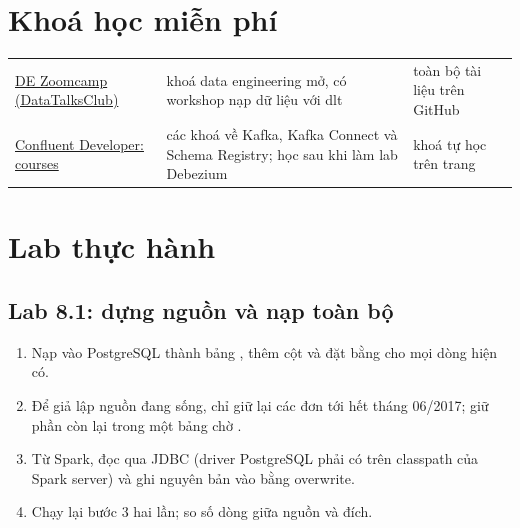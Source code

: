 \section{Khoá học miễn phí}
\begin{xltabular}{\textwidth}{@{}P{4.2cm} L P{2.6cm}@{}}
\toprule
{} &  &  \\
\midrule
\endhead
\bottomrule
\endfoot
\href{https://github.com/DataTalksClub/data-engineering-zoomcamp}{DE Zoomcamp (DataTalksClub)} & khoá data engineering mở, có workshop nạp dữ liệu với dlt & toàn bộ tài liệu trên GitHub \\
\href{https://developer.confluent.io/courses/}{Confluent Developer: courses} & các khoá về Kafka, Kafka Connect và Schema Registry; học sau khi làm lab Debezium & khoá tự học trên trang \\
\end{xltabular}

\section{Lab thực hành}

\subsection{Lab 8.1: dựng nguồn và nạp toàn bộ}
\begin{enumerate}
  \item Nạp  vào PostgreSQL thành bảng , thêm cột  và đặt bằng  cho mọi dòng hiện có.
  \item Để giả lập nguồn đang sống, chỉ giữ lại các đơn tới hết tháng 06/2017; giữ phần còn lại trong một bảng chờ .
  \item Từ Spark, đọc  qua JDBC (driver PostgreSQL phải có trên classpath của Spark server) và ghi nguyên bản vào  bằng overwrite.
  \item Chạy lại bước 3 hai lần; so số dòng giữa nguồn và đích.
\end{enumerate}

